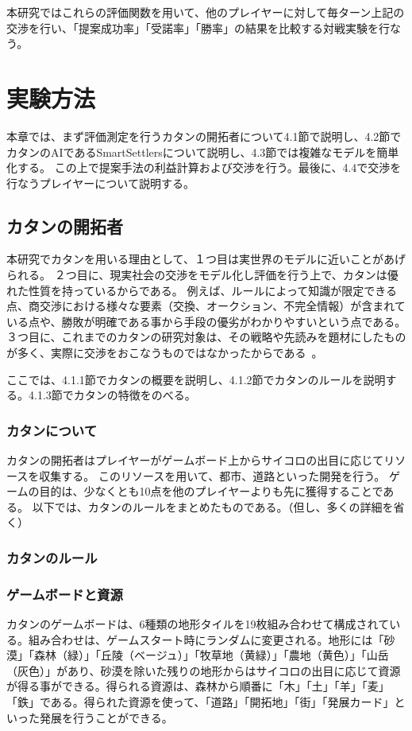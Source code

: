 \documentclass[a4, 10pt,dvipdfmx]{jsarticle}
\begin{document}
本研究ではこれらの評価関数を用いて、他のプレイヤーに対して毎ターン上記の交渉を行い、「提案成功率」「受諾率」「勝率」の結果を比較する対戦実験を行なう。

\section{実験方法}

本章では、まず評価測定を行うカタンの開拓者について4.1節で説明し、4.2節でカタンのAIであるSmartSettlersについて説明し、4.3節では複雑なモデルを簡単化する。
この上で提案手法の利益計算および交渉を行う。最後に、4.4で交渉を行なうプレイヤーについて説明する。

\subsection{カタンの開拓者}

本研究でカタンを用いる理由として、１つ目は実世界のモデルに近いことがあげられる。
２つ目に、現実社会の交渉をモデル化し評価を行う上で、カタンは優れた性質を持っているからである。
例えば、ルールによって知識が限定できる点、商交渉における様々な要素（交換、オークション、不完全情報）が含まれている点や、勝敗が明確である事から手段の優劣がわかりやすいという点である。３つ目に、これまでのカタンの研究対象は、その戦略や先読みを題材にしたものが多く、実際に交渉をおこなうものではなかったからである~\cite{kocsis2006bandit,schadd2009monte}。

ここでは、4.1.1節でカタンの概要を説明し、4.1.2節でカタンのルールを説明する。4.1.3節でカタンの特徴をのべる。

\subsubsection{カタンについて}
カタンの開拓者はプレイヤーがゲームボード上からサイコロの出目に応じてリソースを収集する。
このリソースを用いて、都市、道路といった開発を行う。
ゲームの目的は、少なくとも10点を他のプレイヤーよりも先に獲得することである。
以下では、カタンのルールをまとめたものである。（但し、多くの詳細を省く）
\subsubsection{カタンのルール}

\subsubsection*{ゲームボードと資源}
カタンのゲームボードは、6種類の地形タイルを19枚組み合わせて構成されている。組み合わせは、ゲームスタート時にランダムに変更される。地形には「砂漠」「森林（緑）」「丘陵（ベージュ）」「牧草地（黄緑）」「農地（黄色）」「山岳（灰色）」があり、砂漠を除いた残りの地形からはサイコロの出目に応じて資源が得る事ができる。得られる資源は、森林から順番に「木」「土」「羊」「麦」「鉄」である。得られた資源を使って、「道路」「開拓地」「街」「発展カード」といった発展を行うことができる。
\end{document}
